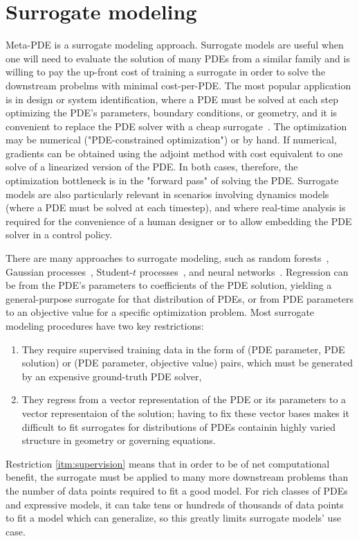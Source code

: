 \section{Surrogate modeling}
Meta-PDE is a surrogate modeling approach.
Surrogate models are useful when one will need to evaluate the solution of many
PDEs from a similar family and is willing to pay the up-front cost of training a
surrogate in order to solve the downstream probelms with minimal cost-per-PDE.
The most popular application is in design or system identification, where a PDE
must be solved at each step optimizing the PDE's parameters, boundary conditions, or geometry,
and it is convenient to replace the PDE solver with a cheap surrogate~\citep{kochenderfer2019algorithms}.
The optimization may be numerical ("PDE-constrained optimization") or by hand.
If numerical, gradients can be obtained using the adjoint method with cost equivalent
to one solve of a linearized version of the PDE.
In both cases, therefore, the optimization bottleneck is in the "forward pass" of solving the PDE.
Surrogate models are also particularly relevant in scenarios involving dynamics models
(where a PDE must be solved at each timestep),
and where real-time analysis is required for the convenience of a human designer or
to allow embedding the PDE solver in a control policy.

There are many approaches to surrogate modeling, such as
random forests~\citep{criminisi2011decision},
Gaussian processes~\citep{shahriari2015taking},
Student-$t$ processes~\citep{shah2014student},
and neural networks~\citep{snoek2015scalable}.
Regression can be from the PDE's parameters to coefficients of the PDE solution,
yielding a general-purpose surrogate for that distribution of PDEs, or from
PDE parameters to an objective value for a specific optimization problem.
Most surrogate modeling procedures have two key restrictions:
\begin{enumerate}
  \item They require supervised training data in the form of
  (PDE parameter, PDE solution) or (PDE parameter, objective value) pairs,
  which must be generated by an expensive ground-truth PDE solver, \label{itm:supervision}
  \item They regress from a vector representation of the PDE or its parameters to a
  vector representaion of the solution; having to fix these vector bases
  makes it difficult to fit surrogates for
  distributions of PDEs containin highly varied structure in geometry or governing
  equations.\label{itm:structure}
\end{enumerate}
Restriction \ref{itm:supervision} means that in order to be of net computational benefit,
the surrogate must be applied to many more downstream problems than the number of
data points required to fit a good model. For rich classes of PDEs and expressive models,
it can take tens or hundreds of thousands of data points to fit a model which can generalize,
so this greatly limits surrogate models' use case.

